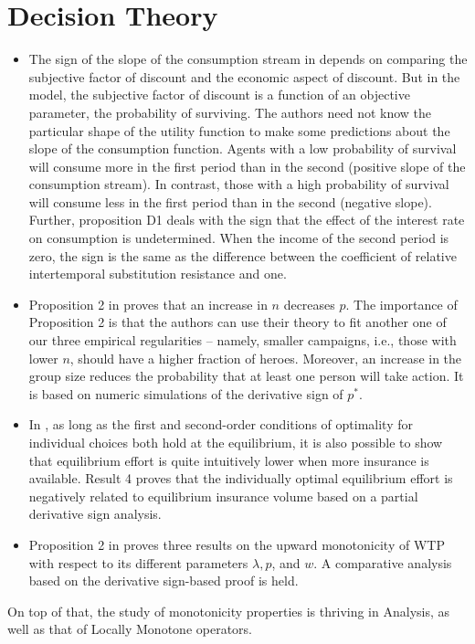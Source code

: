 \documentclass[11pt]{book}
\begin{document}
\section{Decision Theory}
\begin{itemize}
\item The sign of the slope of the consumption stream in \cite{drouhin2001lifetime}
depends on comparing the subjective factor of discount and the economic
aspect of discount. But in the model, the subjective factor of discount
is a function of an objective parameter, the probability of surviving.
The authors need not know the particular shape of the utility function
to make some predictions about the slope of the consumption function.
Agents with a low probability of survival will consume more in the
first period than in the second (positive slope of the consumption
stream). In contrast, those with a high probability of survival will
consume less in the first period than in the second (negative slope).
Further, proposition D1 deals with the sign that the effect of the
interest rate on consumption is undetermined. When the income of the
second period is zero, the sign is the same as the difference between
the coefficient of relative intertemporal substitution resistance
and one.
\item Proposition 2 in \cite{blomberg2008have}
proves that an increase in $n$ decreases $p$. The importance of
Proposition 2 is that the authors can use their theory to fit another
one of our three empirical regularities -- namely, smaller campaigns,
i.e., those with lower $n$, should have a higher fraction of heroes.
Moreover, an increase in the group size reduces the probability that
at least one person will take action. It is based on numeric simulations
of the derivative sign of $p^{*}$.
\item In \cite{bertola2015hidden},
as long as the first and second-order conditions of optimality for
individual choices both hold at the equilibrium, it is also possible
to show that equilibrium effort is quite intuitively lower when more
insurance is available. Result 4 proves that the individually optimal
equilibrium effort is negatively related to equilibrium insurance
volume based on a partial derivative sign analysis.
\item Proposition 2 in \cite{zheng2018willingness}
proves three results on the upward monotonicity of WTP with respect
to its different parameters $\lambda,p$, and $w$. A comparative
analysis based on the derivative sign-based proof is held.
\end{itemize}
On top of that, the study of monotonicity properties is thriving in
Analysis, as well as that of Locally Monotone operators.
\end{document}
